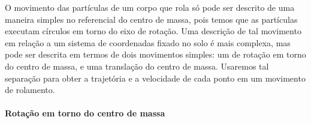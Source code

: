 O movimento das partículas de um corpo que rola só pode ser descrito de uma maneira simples no referencial do centro de massa, pois temos que as partículas executam círculos em torno do eixo de rotação. Uma descrição de tal movimento em relação a um sistema de coordenadas fixado no solo é mais complexa, mas pode ser descrita em termos de dois movimentos simples: um de rotação em torno do centro de massa, e uma translação do centro de massa. Usaremos tal separação para obter a trajetória e a velocidade de cada ponto em um movimento de rolamento.

\paragraph{Rotação em torno do centro de massa}

